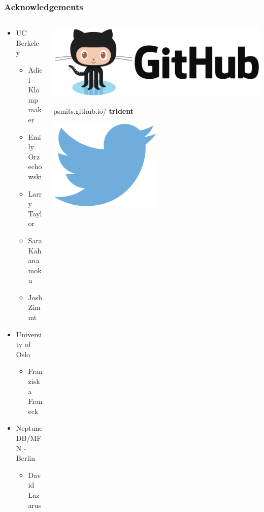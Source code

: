 \documentclass{beamer}
\begin{document}
\begin{frame}
  \frametitle{Acknowledgements}
  \begin{columns}
    \begin{column}{0.5\textwidth}
      \begin{itemize}
        \item UC Berkeley
          \begin{itemize}
            \item Adiel Klompmaker 
            \item Emily Orzechowski
            \item Larry Taylor
            \item Sara Kahanamoku
            \item Josh Zimmt
          \end{itemize}
        \item University of Oslo
          \begin{itemize}
            \item Franziska Franeck
          \end{itemize}
        \item Neptune DB/MFN - Berlin
          \begin{itemize}
            \item David Lazarus
          \end{itemize}
      \end{itemize}
    \end{column}
    \begin{column}{0.5\textwidth}
      \begin{center}
        \includegraphics[height=0.15\textheight,width=\textwidth,keepaspectratio=true]{figure/github-logo}

        psmits.github.io/ \hspace*{0.05\textwidth} \textbf{trident}
      \end{center}
      \vspace*{0.02\textheight}
      \begin{center}
        \includegraphics[height=0.1\textheight,width=0.5\textwidth,keepaspectratio=true]{figure/twitter} 


\end{center}
\end{column}
\end{columns}
\end{frame}
\end{document}
